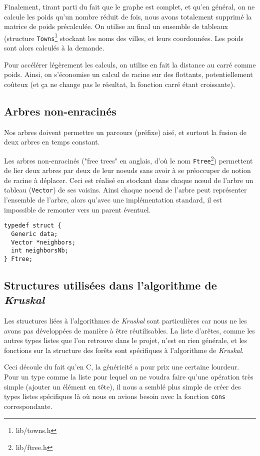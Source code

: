 \documentclass[a4paper]{article}
\begin{document}
Finalement, tirant parti du fait que le graphe est complet, et qu'en général, on ne calcule les poids qu'un nombre réduit de fois, nous avons totalement supprimé la matrice de poids précalculée. On utilise au final un ensemble de tableaux (structure \texttt{Towns}\footnote{lib/towns.h} stockant les noms des villes, et leurs coordonnées. Les poids sont alors calculés à la demande.

Pour accélérer légèrement les calculs, on utilise en fait la distance au carré comme poids. Ainsi, on s'économise un calcul de racine sur des flottants, potentiellement coûteux (et ça ne change pas le résultat, la fonction carré étant croissante).

\subsection{Arbres non-enracinés}

Nos arbres doivent permettre un parcours (préfixe) aisé, et surtout la fusion de deux arbres en temps constant.

Les arbres non-enracinés ("free trees" en anglais, d'où le nom \texttt{Ftree}\footnote{lib/ftree.h}) permettent de lier deux arbres par deux de leur noeuds sans avoir à se préoccuper de notion de racine à déplacer. Ceci est réalisé en stockant dans chaque nœud de l'arbre un tableau (\texttt{Vector}) de ses voisins. Ainsi chaque noeud de l'arbre peut représenter l'ensemble de l'arbre, alors qu'avec une implémentation standard, il est impossible de remonter vers un parent éventuel.

\begin{verbatim}
typedef struct {
  Generic data;
  Vector *neighbors;
  int neighborsNb;
} Ftree;
\end{verbatim}

\subsection{Structures utilisées dans l'algorithme de \emph{Kruskal}}

Les structures liées à l'algorithmes de \emph{Kruskal} sont particulières car nous ne les avons pas développées de manière à être réutilisables. La liste d'arêtes, comme les autres types listes que l'on retrouve dans le projet, n'est en rien générale, et les fonctions sur la structure des forêts sont spécifiques à l'algorithme de \emph{Kruskal}.

Ceci découle du fait qu'en C, la généricité a pour prix une certaine lourdeur. Pour un type comme la liste pour lequel on ne voudra faire qu'une opération très simple (ajouter un élément en tête), il nous a semblé plus simple de créer des types listes spécifiques là où nous en avions besoin avec la fonction \texttt{cons} correspondante.
\end{document}
